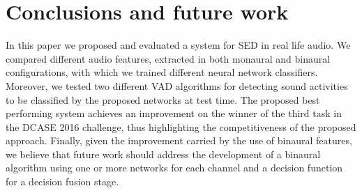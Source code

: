 \section{Conclusions and future work}
\label{sec:conclusions}

In this paper we proposed and evaluated a system for SED in real life audio. We compared different audio features, extracted in both monaural and binaural configurations, with which we trained different neural network classifiers. Moreover, we tested two different VAD algorithms for detecting sound activities to be classified by the proposed networks at test time. The proposed best performing system achieves an improvement on the winner of the third task in the DCASE 2016 challenge, thus highlighting the competitiveness of the proposed approach. Finally, given the improvement carried by the use of binaural features, we believe that future work should address the development of a binaural algorithm using one or more networks for each channel and a decision function for a decision fusion stage.